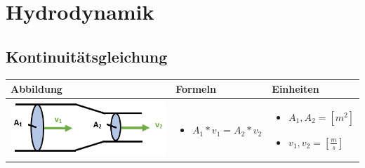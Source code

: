 \newpage
\section{Hydrodynamik}

\subsection{Kontinuitätsgleichung}				%
\begin{table}[h!]
	\begin{tabular}{ | m{6cm} | m{6cm} | m{6cm} | }
		\hline
		Abbildung & Formeln & Einheiten \\ \hline
		\midrule
		\begin{minipage}{.3\textwidth}
			\includegraphics[width=6.0cm]{Figures/kontinuitaet}
		\end{minipage}
		&
		\begin{itemize}
			\item $A_{1}*v_{1}=A_{2}*v_{2}$			
		\end{itemize}
		& 
		\begin{itemize}
			\item $A_{1},A_{2}=[m^2]$
			\item $v_{1},v_{2}=[\frac{m}{s}]$	
		\end{itemize}
		\\ \hline
	\end{tabular}
\end{table}

